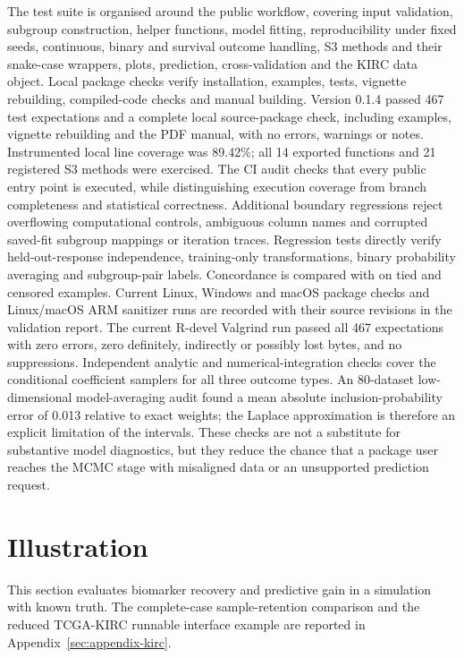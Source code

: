 \documentclass[article]{jss}
\begin{document}
The test suite is organised around the public workflow, covering input
validation, subgroup construction, helper functions, model fitting,
reproducibility under fixed seeds, continuous, binary and survival outcome handling,
S3 methods and their snake-case wrappers, plots, prediction, cross-validation and
the KIRC data object.
Local package checks verify installation, examples, tests, vignette rebuilding,
compiled-code checks and manual building.
Version 0.1.4 passed 467 test expectations and a complete local source-package
check, including examples, vignette rebuilding and the PDF manual, with no
errors, warnings or notes. Instrumented local line coverage was 89.42\%; all
14 exported functions and 21 registered S3 methods were exercised. The CI audit
checks that every public entry point is executed, while distinguishing execution
coverage from branch completeness and statistical correctness. Additional
boundary regressions reject overflowing computational controls, ambiguous column
names and corrupted saved-fit subgroup mappings or iteration traces.
Regression tests directly verify held-out-response independence, training-only
transformations, binary probability averaging and subgroup-pair labels.
Concordance is compared with  on tied and censored
examples. Current Linux, Windows and macOS package checks and Linux/macOS ARM
sanitizer runs are recorded with their source revisions in the validation report.
The current R-devel Valgrind run passed all 467 expectations with zero errors,
zero definitely, indirectly or possibly lost bytes, and no suppressions.
Independent analytic and numerical-integration checks cover the conditional coefficient
samplers for all three outcome types. An 80-dataset low-dimensional
model-averaging audit found a mean absolute inclusion-probability error of
0.013 relative to exact weights; the Laplace approximation is therefore an
explicit limitation of the intervals.
These checks are not a substitute for substantive model diagnostics, but they
reduce the chance that a package user reaches the MCMC stage with misaligned
data or an unsupported prediction request.

\section{Illustration}\label{sec:illustration}

This section evaluates biomarker recovery and predictive gain in a simulation
with known truth.  The complete-case sample-retention comparison and the reduced
TCGA-KIRC runnable interface example are reported in
Appendix~\ref{sec:appendix-kirc}.
\end{document}
